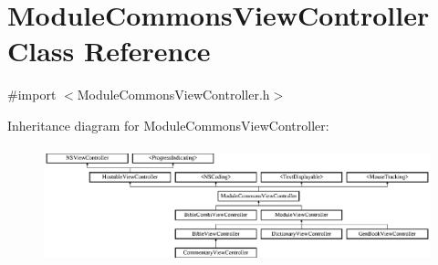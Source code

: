 \hypertarget{interface_module_commons_view_controller}{\section{Module\-Commons\-View\-Controller Class Reference}
\label{interface_module_commons_view_controller}
}


{\ttfamily \#import $<$Module\-Commons\-View\-Controller.\-h$>$}

Inheritance diagram for Module\-Commons\-View\-Controller\-:\begin{figure}[H]
\begin{center}
\leavevmode
\includegraphics[height=3.360000cm]{interface_module_commons_view_controller}
\end{center}
\end{figure}
